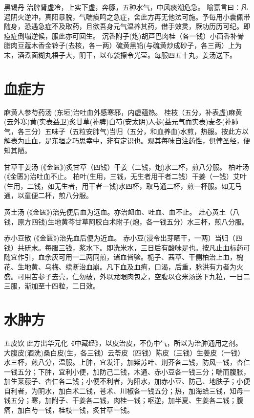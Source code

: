 \documentclass[a4paper,12pt,UTF8,twoside]{ctexbook}
\begin{document}
	黑锡丹
	治脾肾虚冷，上实下虚，奔豚，五种水气，中风痰潮危急。
	喻嘉言曰∶凡遇阴火逆冲，真阳暴脱，气喘痰鸣之急症，舍此方再无他法可施。予每用小囊佩带随身，恐遇急症不及取药，且欲吾身元气温养其药，借手效灵，厥功历历可纪。即痘症倒塌逆候，服此亦可回生。
	沉香附子(炮)胡芦巴肉桂（各一钱）小茴香补骨脂肉豆蔻木香金铃子(去核，各一两）硫黄黑铅(与硫黄炒成砂子，各三两）上为末，酒煮面糊丸梧子大，阴干，以布袋擦令光莹。每服四五十丸，姜汤送下。
	
	\chapter{血症方}
	 麻黄人参芍药汤
	(东垣)治吐血外感寒邪，内虚蕴热。
	桂枝（五分，补表虚)麻黄(去外寒)黄(实表益卫)炙甘草(补脾)白芍(安太阴)人参(益元气而实表)麦冬(补肺气，各三分）五味子（五粒安肺气)当归（五分，和血养血)水煎，热服。按此方以解表为止血，是东垣之巧思幸中，非有定识也。观其每味自注药性，俱悖圣经，便知其陋。
	
	甘草干姜汤
	(《金匮》)炙甘草（四钱）干姜（二钱，炮)水二杯，煎八分服。
	柏叶汤(《金匮》)治吐血不止。
	柏叶(生用，三钱，无生者用干者二钱）干姜（一钱）艾叶(生用，二钱，如无生者，用干者一钱)水四杯，取马通二杯，煎一杯服。如无马通，以童便二杯，煎八分服。
	
	黄土汤
	(《金匮》)治先便后血为远血。亦治衄血、吐血、血不止。
	灶心黄土（八钱，原方四钱)生地黄芩甘草阿胶白术附子(炮，各一钱五分）水三杯，煎八分服。
	
	赤小豆散
	(《金匮》)治先血后便为近血。
	赤小豆(浸令出芽晒干，一两）当归（四钱）共研末。每服三钱，浆水下。即洗米水，三日后有酸味是也。按凡止血标药可随宜作引，血余灰可用一二两同煎，诸血皆验。栀子、茜草、干侧柏治上血，槐花、生地黄、乌梅、续断治血崩。凡下血及血痢，口渴，后重，脉洪有力者为火盛。可用苦参子去壳，仁勿破，外以龙眼肉包之，空腹以仓米汤送下九粒，一日二三服，渐加至十四粒，二日效。
	
	
	
	\chapter{水肿方}
		
	五皮饮
	此方出华元化《中藏经》，以皮治皮，不伤中气，所以为治肿通用之剂。
	大腹皮(酒洗)桑白皮(生，各三钱）云苓皮（四钱）陈皮（三钱）生姜皮（一钱）水三杯，煎八分，温服。上肿，宜发汗，加紫苏叶、荆芥各二钱，防风一钱，杏仁一钱五分；下肿，宜利小便，加防己二钱，木通、赤小豆各一钱三分；喘而腹胀，加生莱菔子、杏仁各二钱；小便不利者，为阳水，加赤小豆、防己、地肤子；小便自利者，为阴水，加白术二钱，苍术、川椒各一钱五分；热，加海蛤三钱，知母一钱五分；寒，加附子、干姜各二钱，肉桂一钱；呕逆，加半夏、生姜各二钱；腹痛，加白芍一钱，桂枝一钱，炙甘草一钱。
	
\end{document}
